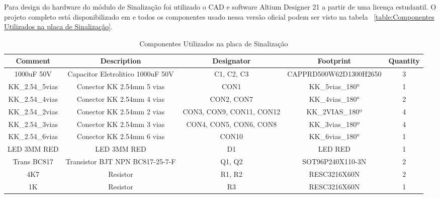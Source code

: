 \documentclass[../delivery_hospital_report.tex]{subfiles}
\begin{document}
Para design do hardware do módulo de Sinalização foi utilizado o CAD e software Altium Designer 21 \cite{altium21} a partir de uma licença estudantil. O projeto completo está disponibilizado em \cite{github_modulos} e todos os componentes usado nessa versão oficial podem ser visto na tabela ~\ref{table:Componentes Utilizados na placa de Sinalização}.

\begin{table}[!ht]
\caption{Componentes Utilizados na placa de Sinalização}
\centering
\begin{adjustbox}{width=\columnwidth,center}
\begin{tabular}{|c|c|c|c|c|}
\hline
Comment                   & Description                                  & Designator                & Footprint                 & Quantity \\ \hline
1000uF 50V                & Capacitor Eletrolitico 1000uF 50V            & C1, C2, C3                & CAPPRD500W62D1300H2650    & 3        \\ \hline
KK\_2.54\_5vias           & Conector KK 2.54mm 5 vias                    & CON1                      & KK\_5vias\_180°           & 1        \\ \hline
KK\_2.54\_4vias           & Conector KK 2.54mm 4 vias                    & CON2, CON7                & KK\_4vias\_180°           & 2        \\ \hline
KK\_2.54\_2vias           & Conector KK 2.54mm 2 vias                    & CON3, CON9, CON11, CON12  & KK\_2VIAS\_180º           & 4        \\ \hline
KK\_2.54\_3vias           & Conector KK 2.54mm 3 vias                    & CON4, CON5, CON6, CON8    & KK\_3vias\_180º           & 4        \\ \hline
KK\_2.54\_6vias           & Conector KK 2.54mm 6 vias                    & CON10                     & KK\_6vias\_180°           & 1        \\ \hline
LED 3MM RED               & LED 3MM RED                                  & D1                        & LED RED                   & 1        \\ \hline
Trans BC817               & Transistor BJT NPN BC817-25-7-F              & Q1, Q2                    & SOT96P240X110-3N          & 2        \\ \hline
4K7                       & Resistor                                     & R1, R2                    & RESC3216X60N              & 2        \\ \hline
1K                        & Resistor                                     & R3                        & RESC3216X60N              & 1        \\ \hline

\end{tabular}
\end{adjustbox}
\end{table}
\end{document}
